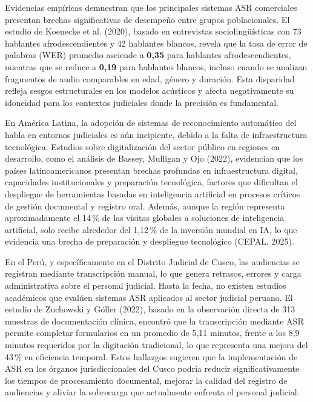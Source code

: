 \documentclass[12pt,a4paper,oneside]{report}
\begin{document}
Evidencias empíricas demuestran que los principales sistemas ASR comerciales presentan brechas significativas de desempeño entre grupos poblacionales. El estudio de Koenecke et al. (2020), basado en entrevistas sociolingüísticas con 73 hablantes afrodescendientes y 42 hablantes blancos, revela que la tasa de error de palabras (WER) promedio asciende a \textbf{0,35} para hablantes afrodescendientes, mientras que se reduce a \textbf{0,19} para hablantes blancos, incluso cuando se analizan fragmentos de audio comparables en edad, género y duración. Esta disparidad refleja sesgos estructurales en los modelos acústicos y afecta negativamente su idoneidad para los contextos judiciales donde la precisión es fundamental.

En América Latina, la adopción de sistemas de reconocimiento automático del habla en entornos judiciales es aún incipiente, debido a la falta de infraestructura tecnológica. Estudios sobre digitalización del sector público en regiones en desarrollo, como el análisis de Bassey, Mulligan y Ojo (2022), evidencian que los países latinoamericanos presentan brechas profundas en infraestructura digital, capacidades institucionales y preparación tecnológica, factores que dificultan el despliegue de herramientas basadas en inteligencia artificial en procesos críticos de gestión documental y registro oral. Además, aunque la región representa aproximadamente el 14\,\% de las visitas globales a soluciones de inteligencia artificial, solo recibe alrededor del 1,12\,\% de la inversión mundial en IA, lo que evidencia una brecha de preparación y despliegue tecnológico (CEPAL, 2025).

En el Perú, y específicamente en el Distrito Judicial de Cusco, las audiencias se registran mediante transcripción manual, lo que genera retrasos, errores y carga administrativa sobre el personal judicial. Hasta la fecha, no existen estudios académicos que evalúen sistemas ASR aplicados al sector judicial peruano. El estudio de Zuchowski y Göller (2022), basado en la observación directa de 313 muestras de documentación clínica, encontró que la transcripción mediante ASR permite completar formularios en un promedio de 5,11 minutos, frente a los 8,9 minutos requeridos por la digitación tradicional, lo que representa una mejora del 43\,\% en eficiencia temporal. Estos hallazgos sugieren que la implementación de ASR en los órganos jurisdiccionales del Cusco podría reducir significativamente los tiempos de procesamiento documental, mejorar la calidad del registro de audiencias y aliviar la sobrecarga que actualmente enfrenta el personal judicial.
\end{document}
